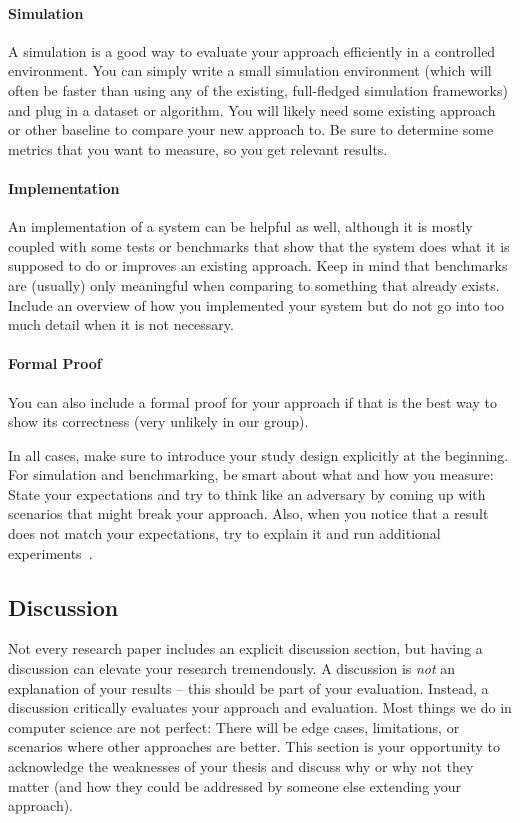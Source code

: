 \documentclass[a4]{article}
\begin{document}
\paragraph{Simulation}
A simulation is a good way to evaluate your approach efficiently in a controlled environment.
You can simply write a small simulation environment (which will often be faster than using any of the existing, full-fledged simulation frameworks) and plug in a dataset or algorithm.
You will likely need some existing approach or other baseline to compare your new approach to.
Be sure to determine some metrics that you want to measure, so you get relevant results.

\paragraph{Implementation}
An implementation of a system can be helpful as well, although it is mostly coupled with some tests or benchmarks that show that the system does what it is supposed to do or improves an existing approach.
Keep in mind that benchmarks are (usually) only meaningful when comparing to something that already exists.
Include an overview of how you implemented your system but do not go into too much detail when it is not necessary.

\paragraph{Formal Proof}
You can also include a formal proof for your approach if that is the best way to show its correctness (very unlikely in our group).

In all cases, make sure to introduce your study design explicitly at the beginning.
For simulation and benchmarking, be smart about what and how you measure:
State your expectations and try to think like an adversary by coming up with scenarios that might break your approach.
Also, when you notice that a result does not match your expectations, try to explain it and run additional experiments~\cite{mhandley-twitter}.

\subsection{Discussion}
Not every research paper includes an explicit discussion section, but having a discussion can elevate your research tremendously.
A discussion is \emph{not} an explanation of your results -- this should be part of your evaluation.
Instead, a discussion critically evaluates your approach and evaluation.
Most things we do in computer science are not perfect:
There will be edge cases, limitations, or scenarios where other approaches are better.
This section is your opportunity to acknowledge the weaknesses of your thesis and discuss why or why not they matter (and how they could be addressed by someone else extending your approach).
\end{document}
